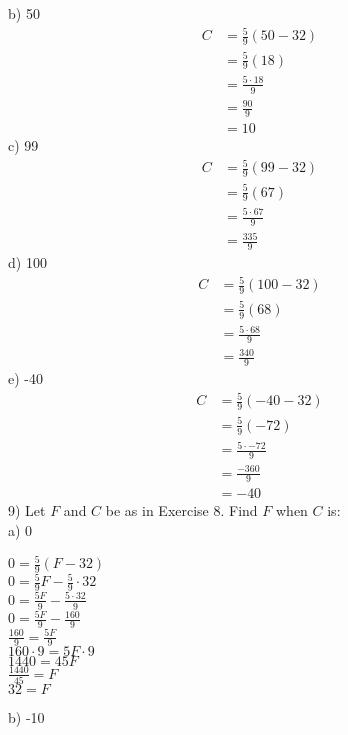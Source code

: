 \documentclass[12pt]{article}
\begin{document}
b) 50
\begin{align*}
C&=\displaystyle \frac{5}{9}(50-32) \\
&=\displaystyle \frac{5}{9}(18) \\
&=\displaystyle \frac{5\cdot18}{9} \\
&=\displaystyle \frac{90}{9} \\
&=10
\end{align*}
c) 99
\begin{align*}
C&=\displaystyle \frac{5}{9}(99-32) \\
&=\displaystyle \frac{5}{9}(67) \\
&=\displaystyle \frac{5\cdot67}{9} \\
&=\displaystyle \frac{335}{9}
\end{align*}
d) 100
\begin{align*}
C&=\displaystyle \frac{5}{9}(100-32) \\
&=\displaystyle \frac{5}{9}(68) \\
&=\displaystyle \frac{5\cdot68}{9} \\
&=\displaystyle \frac{340}{9}
\end{align*}
e) -40
\begin{align*}
C&=\displaystyle \frac{5}{9}(-40-32) \\
&=\displaystyle \frac{5}{9}(-72) \\
&=\displaystyle \frac{5\cdot-72}{9} \\
&=\displaystyle \frac{-360}{9} \\
&=-40
\end{align*}
9) Let $F$ and $C$ be as in Exercise 8. Find $F$ when $C$ is: \\
a) 0
\begin{center}
$0=\displaystyle \frac{5}{9}(F-32)$ \\
$0=\displaystyle \frac{5}{9}F-\displaystyle \frac{5}{9}\cdot32$ \\
$0=\displaystyle \frac{5F}{9}-\displaystyle \frac{5\cdot32}{9}$ \\
$0=\displaystyle \frac{5F}{9}-\displaystyle \frac{160}{9}$ \\
$\displaystyle \frac{160}{9}=\displaystyle \frac{5F}{9}$ \\
$160\cdot9=5F\cdot9$ \\
$1440=45F$ \\
$\displaystyle \frac{1440}{45}=F$ \\
$32=F$
\end{center}
b) -10
\end{document}
